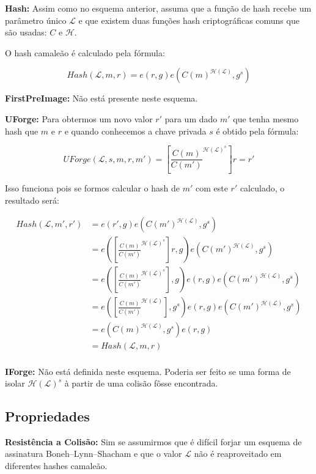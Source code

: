 \documentclass[a4paper]{article}
\begin{document}
\textbf{Hash: } Assim como no esquema anterior, assuma que a função de
hash recebe um parâmetro único $\mathcal{L}$ e que existem duas
funções hash criptográficas comuns que são usadas: $C$ e
$\mathcal{H}$.

O hash camaleão é calculado  pela fórmula:

$$
Hash(\mathcal{L}, m, r) = e(r, g)e(C(m)^{\mathcal{H}(\mathcal{L})}, g^s)
$$

\textbf{FirstPreImage:} Não está presente neste esquema.

\textbf{UForge:} Para obtermos um novo valor $r'$ para um dado $m'$
que tenha mesmo hash que $m$ e $r$ e quando conhecemos a chave privada
$s$ é obtido pela fórmula:

$$
UForge(\mathcal{L}, s, m, r, m') = \left[\frac{C(m)}{C(m')}^{\mathcal{H}(\mathcal{L})^s}\right]r = r'
$$

Isso funciona pois se formos calcular o hash de $m'$ com este $r'$
calculado, o resultado será:

\begin{equation}
\begin{split}
  Hash(\mathcal{L}, m', r') &= e(r', g)e(C(m')^{\mathcal{H}(\mathcal{L})}, g^s)\\
  &= e(\left[\frac{C(m)}{C(m')}^{\mathcal{H}(\mathcal{L})^s}\right]r, g)e(C(m')^{\mathcal{H}(\mathcal{L})}, g^s)\\
  &=e(\left[\frac{C(m)}{C(m')}^{\mathcal{H}(\mathcal{L})^s}\right], g)e(r, g)e(C(m')^{\mathcal{H}(\mathcal{L})}, g^s)\\
  &=e(\left[\frac{C(m)}{C(m')}^{\mathcal{H}(\mathcal{L})}\right], g^s)e(r, g)e(C(m')^{\mathcal{H}(\mathcal{L})}, g^s)\\
  &=e(C(m)^{\mathcal{H}(\mathcal{L})}, g^s)e(r, g)\\
  &= Hash(\mathcal{L}, m, r)\\
\end{split}
\end{equation}

\textbf{IForge:} Não está definida neste esquema. Poderia ser feito se
uma forma de isolar $\mathcal{H}(\mathcal{L})^s$ à partir de uma
colisão fôsse encontrada.

\subsection{Propriedades}

\textbf{Resistência a Colisão: }Sim se assumirmos que é difícil forjar
um esquema de assinatura Boneh–Lynn–Shacham e que o valor
$\mathcal{L}$ não é reaproveitado em diferentes hashes camaleão.
\end{document}
